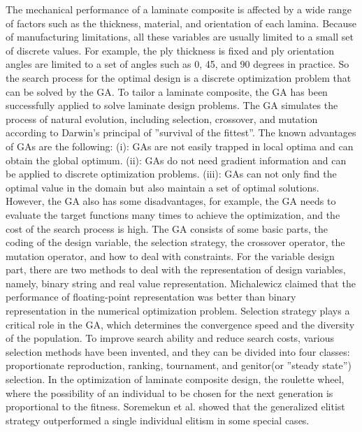 \documentclass[Afour,sagev,times]{sagej}
\begin{document}
The mechanical performance of a laminate composite is affected by a wide range of factors such as the
thickness, material, and orientation of each lamina. Because of manufacturing limitations, all these
variables are usually limited to a small set of discrete values. For example, the ply thickness is fixed
and ply orientation angles are limited to a set of angles such as 0, 45, and 90 degrees in practice. So
the search process for the optimal design is a discrete optimization problem that can be solved by the
GA. To tailor a laminate composite, the GA has been successfully applied to solve laminate design
problems\cite{riche1993optimization,nagendra1996improved,sadagopan1998application,todoroki1998stacking,liu2000permutation,sivakumar1998optimum,walker2003technique,lin2004stacking,kang2005minimum,murugan2007target,akbulut2008optimum}.
The GA simulates the process of natural evolution, including selection, crossover, and mutation
according to Darwin's principal of ''survival of the fittest''. The known advantages of GAs are the
following: (i): GAs are not easily trapped in local optima and can obtain the global
optimum. (ii): GAs do not need gradient information and can be applied to discrete optimization
problems. (iii): GAs can not only find the optimal value in the domain but also maintain a
set of optimal solutions. However, the GA also has some disadvantages, for example, the GA
needs to evaluate the target functions many times to achieve the optimization, and the cost of the
search process is high. The GA consists of some basic parts, the coding of the design variable,
the selection strategy, the crossover operator, the mutation operator, and how to deal with constraints. For the
variable design part, there are two methods to deal with the representation of design variables, namely,
binary string and real value representation\cite{riche1993optimization,todoroki1998stacking}.
Michalewicz\cite{zbigniew1996genetic} claimed that the performance of floating-point representation was
better than binary representation in the numerical optimization problem. Selection strategy plays a
critical role in the GA, which determines the convergence speed and the diversity of the population. To
improve search ability and reduce search costs, various selection methods have been invented, and they
can be divided into four classes: proportionate reproduction, ranking, tournament, and
genitor(or ''steady state'') selection. In the optimization of laminate composite design, the roulette
wheel\cite{riche1993optimization,seresta2007optimal}, where the possibility of an individual to be
chosen for the next generation is proportional to the fitness.
Soremekun et al.\cite{soremekun2001composite} showed that the generalized elitist strategy outperformed a
single individual elitism in some special cases.
\end{document}
